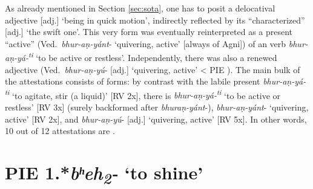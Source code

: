 \documentclass[output=paper,colorlinks,citecolor=brown]{langscibook}
\begin{document}
As already mentioned in Section \ref{sec:sota}, one has to posit a delocatival adjective  [adj.] ‘being in quick motion’, indirectly reflected by its “characterized”   [adj.] ‘the swift one’. This very form was eventually reinterpreted as a present “active”  (Ved.\ \textit{bhur-aṇ-yánt}-  ‘quivering, active’ [always of Agni]) of an  verb \textit{bhur-aṇ-yá-\textsuperscript{ti}}  ‘to be active or restless’. Independently, there was also a renewed adjective (Ved.\ \textit{bhur-aṇ-yú}-  [adj.] ‘quivering, active’ < PIE ). The main bulk of the attestations consists of  forms: by contrast with the labile  present \textit{bhur-aṇ-yá-\textsuperscript{ti}}  ‘to agitate, stir (a liquid)’ [RV 2x], there is \textit{bhur-aṇ-yá-\textsuperscript{ti}}  ‘to be active or restless’ [RV 3x] (surely backformed after    \textit{bhuraṇ-yánt}-), \textit{bhur-aṇ-yánt}- ‘quivering, active’ [RV 2x], and \textit{bhur-aṇ-yú}-  [adj.] ‘quivering, active’ [RV 5x]. In other words, 10 out of 12 attestations are .

\section{PIE 1.*\textit{bʰeh\textsubscript{2}}\textit{-} ‘to shine’}
\label{sec:3}
\end{document}

